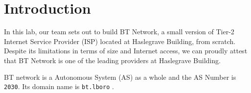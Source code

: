 \chapter{Introduction}
\label{chap:introduction}

In this lab, our team sets out to build BT Network, a small version of Tier-2 Internet Service Provider (ISP) located at Haslegrave Building, from scratch. Despite its limitations in terms of size and Internet access, we can proudly attest that BT Network is one of the leading providers at Haslegrave Building.

BT network is a Autonomous System (AS) as a whole and the AS Number is \texttt{2030}. Its domain name is \texttt{bt.lboro} .

